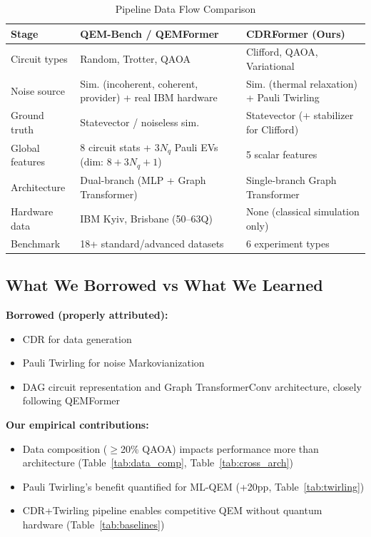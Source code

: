 \documentclass[11pt, a4paper]{article}
\begin{document}
\begin{table}[H]
\centering
\caption{Pipeline Data Flow Comparison}
\label{tab:pipeline_comparison}
\begin{tabular}{@{}p{2.5cm}p{5cm}p{5cm}@{}}
\toprule
\textbf{Stage} & \textbf{QEM-Bench / QEMFormer} & \textbf{CDRFormer (Ours)} \\ \midrule
Circuit types & Random, Trotter, QAOA & Clifford, QAOA, Variational \\
Noise source & Sim. (incoherent, coherent, provider) + real IBM hardware & Sim. (thermal relaxation) + Pauli Twirling \\
Ground truth & Statevector / noiseless sim. & Statevector (+ stabilizer for Clifford) \\
Global features & 8 circuit stats + $3N_q$ Pauli EVs (dim: $8+3N_q+1$) & 5 scalar features \\
Architecture & Dual-branch (MLP + Graph Transformer) & Single-branch Graph Transformer \\
Hardware data & IBM Kyiv, Brisbane (50--63Q) & None (classical simulation only) \\
Benchmark & 18+ standard/advanced datasets & 6 experiment types \\
\bottomrule
\end{tabular}
\end{table}

\subsection{What We Borrowed vs What We Learned}

\textbf{Borrowed (properly attributed):}
\begin{itemize}
    \item CDR for data generation~\cite{czarnik2021cdr}
    \item Pauli Twirling for noise Markovianization~\cite{wallman2016twirling}
    \item DAG circuit representation and Graph TransformerConv architecture,
    closely following QEMFormer~\cite{bao2025qemformer}
\end{itemize}

\textbf{Our empirical contributions:}
\begin{itemize}
    \item Data composition ($\geq$20\% QAOA) impacts performance more
    than architecture (Table~\ref{tab:data_comp}, Table~\ref{tab:cross_arch})
    \item Pauli Twirling's benefit quantified for ML-QEM (+20pp,
    Table~\ref{tab:twirling})
    \item CDR+Twirling pipeline enables competitive QEM without quantum
    hardware (Table~\ref{tab:baselines})
\end{itemize}
\end{document}
